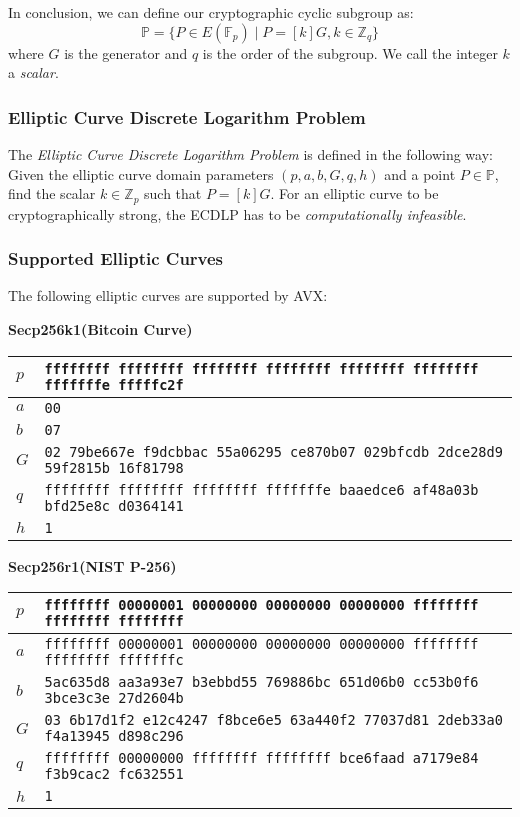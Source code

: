 In conclusion, we can define our cryptographic cyclic subgroup as:
\[ \mathbb{P} = \{ P \in E(\mathbb{F}_p) \mid P = [k]G, k \in \mathbb{Z}_q \} \]
where $G$ is the generator and $q$ is the order of the subgroup. We call the integer $k$ a \textit{scalar}.


\subsubsection{Elliptic Curve Discrete Logarithm Problem} \label{app: elliptic curve discrete logarithm problem}
The \textit{Elliptic Curve Discrete Logarithm Problem} is defined in \cite{Trappe05} the following way: Given the elliptic curve domain parameters $(p, a, b, G, q, h)$ and a point $P \in \mathbb{P}$, find the scalar $k \in \mathbb{Z}_p$ such that $P = [k]G$. For an elliptic curve to be cryptographically strong, the ECDLP has to be \textit{computationally infeasible}.


\subsubsection{Supported Elliptic Curves} \label{app: supported elliptic curves}
The following elliptic curves are supported by AVX:

\textbf{Secp256k1(Bitcoin Curve)} 
\par
\begin{tabularx}{\textwidth}{|l|>{\raggedright\arraybackslash}X|} \hline
    $p$ & \texttt{ffffffff ffffffff ffffffff ffffffff ffffffff ffffffff fffffffe fffffc2f} \\ \hline
    $a$ & \texttt{\phantom{000000}00} \\ \hline
    $b$ & \texttt{\phantom{000000}07} \\ \hline
    $G$ & \texttt{\phantom{000000}02 79be667e f9dcbbac 55a06295 ce870b07 029bfcdb 2dce28d9 59f2815b 16f81798} \\ \hline
    $q$ & \texttt{ffffffff ffffffff ffffffff fffffffe baaedce6 af48a03b bfd25e8c d0364141} \\ \hline
    $h$ & \texttt{1} \\ \hline
\end{tabularx}    

\textbf{Secp256r1(NIST P-256)}
\par
\begin{tabularx}{\textwidth}{|l|>{\raggedright\arraybackslash}X|} \hline
    $p$ & \texttt{ffffffff 00000001 00000000 00000000 00000000 ffffffff ffffffff ffffffff} \\ \hline
    $a$ & \texttt{ffffffff 00000001 00000000 00000000 00000000 ffffffff ffffffff fffffffc} \\ \hline
    $b$ & \texttt{5ac635d8 aa3a93e7 b3ebbd55 769886bc 651d06b0 cc53b0f6 3bce3c3e 27d2604b} \\ \hline
    $G$ & \texttt{\phantom{000000}03 6b17d1f2 e12c4247 f8bce6e5 63a440f2 77037d81 2deb33a0 f4a13945 d898c296} \\ \hline
    $q$ & \texttt{ffffffff 00000000 ffffffff ffffffff bce6faad a7179e84 f3b9cac2 fc632551} \\ \hline
    $h$ & \texttt{1} \\ \hline
\end{tabularx}

